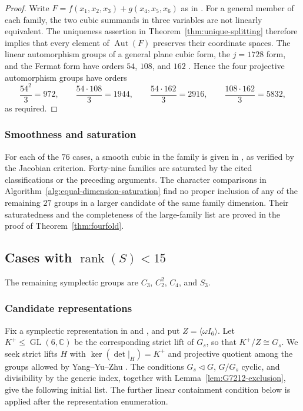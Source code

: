 \documentclass[12pt]{amsart}
\numberwithin{equation}{section}
\theoremstyle{plain}
\theoremstyle{definition}
\theoremstyle{remark}
\newcommand{\CC}{\mathbb C}
\DeclareMathOperator{\Aut}{Aut}
\DeclareMathOperator{\GL}{GL}
\DeclareMathOperator{\rank}{rank}
\begin{document}
\begin{proof}
Write $F=f(x_1,x_2,x_3)+g(x_4,x_5,x_6)$ as in
\cite[\S6.1]{KOIKE202512}.  For a general member of each family, the two
cubic summands in three variables are not linearly equivalent.  The uniqueness assertion in
Theorem~\ref{thm:unique-splitting} therefore implies that every element of
$\Aut(F)$ preserves their coordinate spaces.  The linear automorphism groups
of a general plane cubic form, the $j=1728$ form, and the Fermat form have orders
$54$, $108$, and $162$ \cite[Lemma~3.12]{yang2024automorphism}.  Hence the
four projective automorphism groups have orders
\[
\frac{54^2}{3}=972,\qquad \frac{54\cdot108}{3}=1944,\qquad
\frac{54\cdot162}{3}=2916,\qquad \frac{108\cdot162}{3}=5832,
\]
as required.
\end{proof}

\subsubsection{Smoothness and saturation}

For each of the $76$ cases, a smooth cubic in the family is given in
 \cite{FuWangZhengAutcub4fold2026}, as verified by the Jacobian
criterion.  Forty-nine families are saturated by the cited classifications or
the preceding arguments.  The character comparisons in
Algorithm~\ref{alg:equal-dimension-saturation} find no proper inclusion of
any of the remaining $27$ groups in a larger candidate of the same family
dimension.  Their saturatedness and the completeness of the large-family
list are proved in the proof of Theorem~\ref{thm:fourfold}.

\subsection{Cases with \texorpdfstring{$\rank(S)<15$}{rank(S) less than 15}}
\label{sec:small-nonabelian}

The remaining symplectic groups are $C_3$, $C_2^2$, $C_4$, and $S_3$.

\subsubsection{Candidate representations}

Fix a symplectic representation in \cite[\S3]{KOIKE202512} and \cite{KOIKE2026}, and put $Z=\langle\omega I_6\rangle$.  Let
$K^+\leq\GL(6,\CC)$ be the corresponding strict lift of $G_s$, so that
$K^+/Z\cong G_s$.  We seek strict lifts $H$ with
$\ker(\det|_H)=K^+$ and projective quotient among the groups allowed by
Yang--Yu--Zhu \cite{yang2024automorphism}.  The conditions
$G_s\triangleleft G$, $G/G_s$ cyclic, and divisibility by the generic index,
together with Lemma~\ref{lem:G7212-exclusion}, give the following initial list.
The further linear containment condition below is applied after the
representation enumeration.
\end{document}
